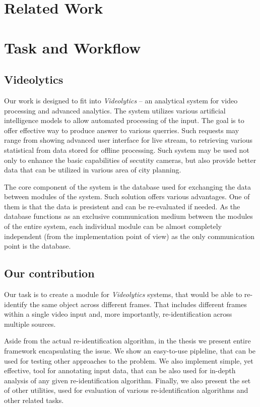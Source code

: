 \chapter{Related Work}

\chapter{Task and Workflow}

\section{Videolytics}

Our work is designed to fit into \emph{Videolytics} -- an analytical system for video processing
and advanced analytics. The system utilizes various artificial intelligence models
to allow automated processing of the input. The goal is to offer effective way 
to produce answer to various querries. Such requests may range from showing advanced
user interface for live stream, to retrieving various statistical from data stored
for offline processing. Such system may be used not only to enhance the basic
capabilities of secutity cameras, but also provide better data that can be utilized
in various area of city planning.

The core component of the system is the database used for exchanging the data between
modules of the system. Such solution offers various advantages. One of them is that the data is
presistent and can be re-evaluated if needed. As the database functions as an exclusive communication medium
between the modules of the entire system, each individual module can be almost
completely independent (from the implementation point of view) as the only
communication point is the database.

\section{Our contribution}

Our task is to create a module for \emph{Videolytics} systems, that would be able
to re-identify the same object across different frames. That includes different
frames within a single video input and, more importantly, re-identification across
multiple sources.

Aside from the actual re-identification algorithm, in the thesis we present entire
framework encapsulating the issue. We show an easy-to-use pipleline, that can be
used for testing other approaches to the problem. We also implement simple, yet
effective, tool for annotating input data, that can be also used for in-depth
analysis of any given re-identification algorithm. Finally, we also present the
set of other utilities, used for evaluation of various re-identification algorithms
and other related tasks.


